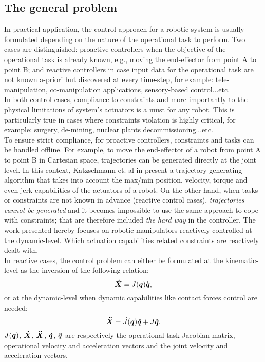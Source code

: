\subsection{The general problem}
\label{sec:gen_prblm}
In practical application, the control approach for a robotic system is usually formulated depending on the nature of the operational task to perform. Two cases are distinguished: proactive controllers when the objective of the operational task is already known, e.g., moving the end-effector from point A to point B; and reactive controllers in case input data for the operational task are not known a-priori but discovered at every time-step, for example: tele-manipulation, co-manipulation applications, sensory-based control...etc. 
\\
In both control cases, compliance to constraints and more importantly to the physical limitations of system's actuators is a must for any robot. This is particularly true in cases where constraints violation is highly critical, for example: surgery, de-mining, nuclear plants decommissioning...etc. 
\\
To ensure strict compliance, for proactive controllers, constraints and tasks can be handled offline. For example, to move the end-effector of a robot from point A to point B in Cartesian space, trajectories can be generated directly at the joint level. In this context, Katzschmann et. al in \cite{katzschmann2013towards} present a trajectory generating algorithm that takes into account the max/min position, velocity, torque and even jerk capabilities of the actuators of a robot. On the other hand, when tasks or constraints are not known in advance (reactive control cases), \textit{trajectories cannot be generated} and it becomes impossible to use the same approach to cope with constraints; that are therefore included \textit{the hard way} in the controller. The work presented hereby focuses on robotic manipulators reactively controlled at the dynamic-level. Which actuation capabilities related constraints are reactively dealt with. 
\\
In reactive cases, the control problem can either be formulated at the kinematic-level as the inversion of the following relation: 
\begin{equation}
\mbox{\boldmath${\dot{X}}$} = J(\mbox{\boldmath${q}$}) \dot{\mbox{\boldmath${q}$}},
\label{eq:vel_kin_opt}
\end{equation}
or at the dynamic-level when dynamic capabilities like contact forces control are needed: 
\begin{equation}
\mbox{\boldmath${\ddot{X}}$} = \dot{J}(\mbox{\boldmath${q}$}) \mbox{\boldmath${\dot{q}}$} + J \ddot{\mbox{\boldmath${q}$}}.
\label{eq:X_ddot}
\end{equation}
$J(\mbox{\boldmath${q}$})$, $\mbox{\boldmath${\dot{X}}$}$, $\mbox{\boldmath${\ddot{X}}$}$, $\mbox{\boldmath${\dot{q}}$}$, $\mbox{\boldmath${\ddot{q}}$}$ are respectively the operational task Jacobian matrix, operational velocity and acceleration vectors and the joint velocity and acceleration vectors.

